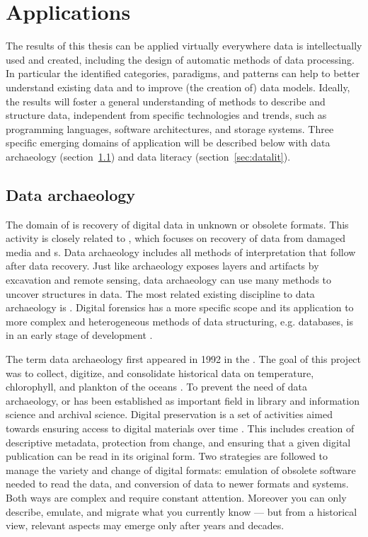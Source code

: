 \section{Applications}
\label{sec:applications}

The results of this thesis can be applied virtually everywhere data is
intellectually used and created, including the design of automatic methods of
data processing. In particular the identified categories, paradigms, and
patterns can help to better understand existing data and to improve (the
creation of) data models. Ideally, the results will foster a general
understanding of methods to describe and structure data, independent from
specific technologies and trends, such as programming languages, software
architectures, and storage systems.  Three specific emerging domains of
application will be described below with data archaeology
(section~\ref{sec:dataarchaeology}) and data literacy
(section~\ref{sec:datalit}).

\subsection{Data archaeology}
\label{sec:dataarchaeology}

The domain of  is recovery of digital data in unknown or
obsolete formats. This activity is closely related to ,
which focuses on recovery of data from damaged media and s.
Data archaeology includes all methods of interpretation that follow after data
recovery.  Just like archaeology exposes layers and artifacts by excavation and
remote sensing, data archaeology can use many methods to uncover structures in
data. The most related existing discipline to data archaeology is .  Digital forensics has a more specific scope and its application to
more complex and heterogeneous methods of data structuring, e.g.  databases, is
in an early stage of development \cite{Olivier2009}.

The term data archaeology first appeared in 1992 in the . The goal of this project
was to collect, digitize, and consolidate historical data on temperature,
chlorophyll, and plankton of the oceans \cite{GODAR2007}.  To prevent the need
of data archaeology,  or  has been established as important field in library and
information science and archival science. Digital preservation is a set of
activities aimed towards ensuring access to digital materials over time
\cite{Caplan2008}. This includes creation of descriptive metadata, protection
from change, and ensuring that a given digital publication can be read in its
original form. Two strategies are followed to manage the variety and change of
digital formats: emulation of obsolete software needed to read the data, and
conversion of data to newer formats and systems. Both ways are complex and
require constant attention.  Moreover you can only describe, emulate, and
migrate what you currently know --- but from a historical view, relevant
aspects may emerge only after years and decades.

